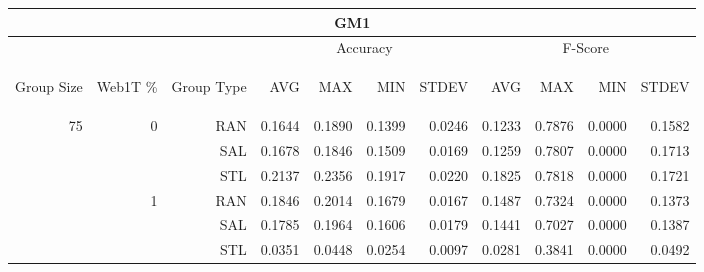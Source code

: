 \begin{center}
\begin{table}[htbp] 
 \begin{center}
\begin{tabular}{ | r | r | r | r | r | r | r | r | r | r | r |}
\hline
\multicolumn{11}{|c|}{GM1}\\
\hline
 & & & \multicolumn{4}{|c|}{Accuracy} & \multicolumn{4}{|c|}{F-Score}\\ \cline{4-11}
\begin{sideways}Group Size\end{sideways} & \begin{sideways}Web1T \%\end{sideways} & \begin{sideways}Group Type\end{sideways} & \begin{sideways}AVG\end{sideways} & \begin{sideways}MAX\end{sideways} & \begin{sideways}MIN\end{sideways} & \begin{sideways}STDEV\end{sideways} & \begin{sideways}AVG\end{sideways} & \begin{sideways}MAX\end{sideways} & \begin{sideways}MIN\end{sideways} & \begin{sideways}STDEV\end{sideways}\\
\hline
\multirow{18}{*}{75}
 & \multirow{3}{*}{0} & RAN & 0.1644 & 0.1890 & 0.1399 & 0.0246 & 0.1233 & 0.7876 & 0.0000 & 0.1582\\ \cline{3-11}
 &   & SAL & 0.1678 & 0.1846 & 0.1509 & 0.0169 & 0.1259 & 0.7807 & 0.0000 & 0.1713\\ \cline{3-11}
 &   & STL & 0.2137 & 0.2356 & 0.1917 & 0.0220 & 0.1825 & 0.7818 & 0.0000 & 0.1721\\ \cline{2-11}
 & \multirow{3}{*}{1} & RAN & 0.1846 & 0.2014 & 0.1679 & 0.0167 & 0.1487 & 0.7324 & 0.0000 & 0.1373\\ \cline{3-11}
 &   & SAL & 0.1785 & 0.1964 & 0.1606 & 0.0179 & 0.1441 & 0.7027 & 0.0000 & 0.1387\\ \cline{3-11}
 &   & STL & 0.0351 & 0.0448 & 0.0254 & 0.0097 & 0.0281 & 0.3841 & 0.0000 & 0.0492\\ \cline{2-11}

\end{tabular}
\end{center}
\end{table}
\end{center}
